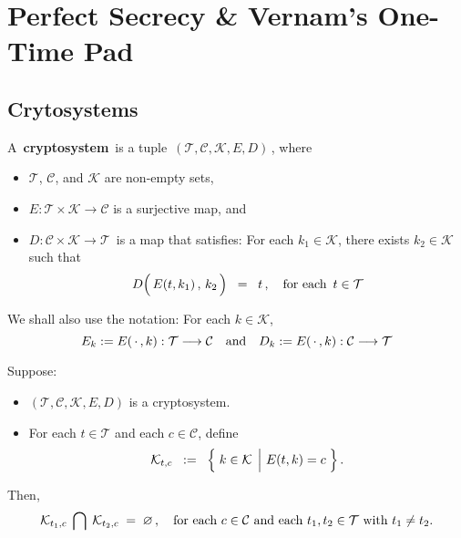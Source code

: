 
\section{Perfect Secrecy \& Vernam's One-Time Pad}
\setcounter{theorem}{0}
\setcounter{equation}{0}

\subsection{Crytosystems}

\begin{definition}[Cryptosystem]
\mbox{}
\vskip 0.1cm
\noindent
A \,\textbf{cryptosystem}\, is a tuple \,$(\mathcal{T},\mathcal{C},\mathcal{K},E,D)$\,, where
\begin{itemize}
\item
	$\mathcal{T}$, $\mathcal{C}$, and $\mathcal{K}$ are non-empty sets,
\item
	$E : \mathcal{T} \times \mathcal{K} \longrightarrow \mathcal{C}$
	is a surjective map, and
\item
	$D : \mathcal{C} \times \mathcal{K} \longrightarrow \mathcal{T}$\,
	is a map that satisfies:
	For each $k_{1} \in \mathcal{K}$, there exists $k_{2} \in \mathcal{K}$
	such that
	\begin{equation*}
	D\!\left(\,\overset{{\color{white}.}}{E}(t,k_{1})\,,\,k_{2}\,\right) \;\; = \;\; t\,,
	\quad
	\textnormal{for each \,$t \in \mathcal{T}$}
	\end{equation*}
\end{itemize}
We shall also use the notation: For each $k \in \mathcal{K}$,
\begin{equation*}
E_{k} := E(\,\cdot\,,k) : \mathcal{T} \longrightarrow \mathcal{C}
\quad\textnormal{and}\quad
D_{k} := E(\,\cdot\,,k) : \mathcal{C} \longrightarrow \mathcal{T}
\end{equation*}
\end{definition}

\begin{proposition}\label{proposition:Disjointness}
\mbox{}
\vskip 0.1cm
\noindent
Suppose:
\begin{itemize}
\item
	$(\mathcal{T},\mathcal{C},\mathcal{K},E,D)$ is a cryptosystem.
\item
	For each $t \in \mathcal{T}$ and each $c \in \mathcal{C}$, define
	\begin{equation*}
	\mathcal{K}_{t,c}
	\;\; := \;\;
		\left\{\,\left.
			\overset{{\color{white}.}}{k} \in \mathcal{K}
		\;\,\right\vert\,
			E(t,k) = c
		\;\right\}.
	\end{equation*}
\end{itemize}
Then,
\begin{equation*}
\mathcal{K}_{t_{1},c} \;\bigcap\; \mathcal{K}_{t_{2},c} \; = \; \varnothing\,,
\quad
\textnormal{for each $c \in \mathcal{C}$ and each $t_{1}, t_{2} \in \mathcal{T}$ with $t_{1} \neq t_{2}$}.
\end{equation*}
\end{proposition}

